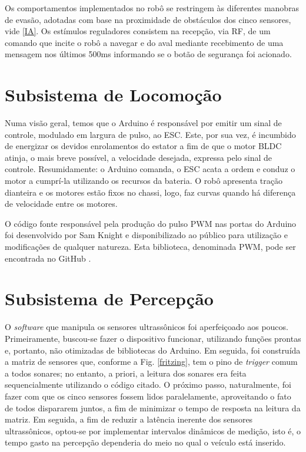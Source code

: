 Os comportamentos implementados no robô se restringem às diferentes manobras de evasão, adotadas com base na proximidade de obstáculos dos cinco 
sensores, vide \ref{IA}. Os estímulos reguladores consistem na recepção, via RF, de um comando que incite o robô a navegar e do aval mediante 
recebimento de uma mensagem nos últimos 500ms informando se o botão de segurança foi acionado.

\section{Subsistema de Locomoção}
Numa visão geral, temos que o Arduino é responsável por emitir um sinal de controle, modulado em largura de pulso, ao ESC.
Este, por sua vez, é incumbido de energizar os devidos enrolamentos do estator a fim de que o motor BLDC atinja, o mais breve possível, a velocidade 
desejada, expressa pelo sinal de controle. 
Resumidamente: o Arduino comanda, o ESC acata a ordem e conduz o motor a cumprí-la utilizando os recursos da bateria.
O robô apresenta tração dianteira e os motores estão fixos no chassi, logo, faz curvas quando há diferença de velocidade entre os motores.

O código fonte responsável pela produção do pulso PWM nas portas do Arduino foi desenvolvido por Sam Knight e disponibilizado ao público para 
utilização e modificações de qualquer natureza.
Esta biblioteca, denominada PWM, pode ser encontrada no GitHub \cite{pwm_lib}.


\section{Subsistema de Percepção}
O \textit{software} que manipula os sensores ultrassônicos foi aperfeiçoado aos poucos.
Primeiramente, buscou-se fazer o dispositivo funcionar, utilizando funções prontas e, portanto, não otimizadas de bibliotecas do Arduino.
Em seguida, foi construída a matriz de sensores que, conforme a Fig. \ref{fritzing}, tem o pino de \textit{trigger} comum a todos sonares; no 
entanto, a priori, a leitura dos sonares era feita sequencialmente utilizando o código citado.
O próximo passo, naturalmente, foi fazer com que os cinco sensores fossem lidos paralelamente, aproveitando o fato de todos dispararem juntos, a fim 
de minimizar o tempo de resposta na leitura da matriz.
Em seguida, a fim de reduzir a latência inerente dos sensores ultrassônicos, optou-se por implementar intervalos dinâmicos de medição, isto é, o 
tempo gasto na percepção dependeria do meio no qual o veículo está inserido.  

